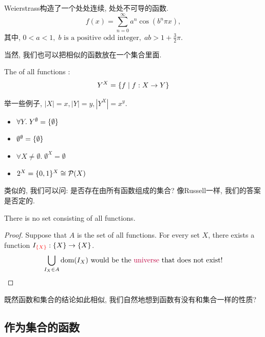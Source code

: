 \begin{fun}
    Weierstrass构造了一个处处连续, 处处不可导的函数. 
    $$
    f(x)=\sum_{n=0} ^\infty a^n \cos(b^n \pi x),
    $$
    其中, $0 < a < 1,\; b \text{ is a positive odd integer},\; ab > 1+\frac{3}{2} \pi$. 
\end{fun}

当然, 我们也可以把相似的函数放在一个集合里面. 

\begin{definition}[$Y^{X}$]
    The  of all functions :
    \[
      Y^{X} = \{f \mid f: X \to Y\}
    \]
\end{definition}

举一些例子, $|X|=x, |Y|=y, |Y^X|=x^y$. 

\begin{eg}
    \begin{itemize}
        \item $\forall Y.\; Y^{\emptyset} = \{\emptyset\}$
        \item $\emptyset^{\emptyset} = \{\emptyset\}$
        \item $\forall X \neq \emptyset.\; \emptyset^{X} =  \emptyset$
        \item $2^{X} = \{0, 1\}^{X} \cong \mathcal{P}(X)$
    \end{itemize}
    
\end{eg}

类似的, 我们可以问: 是否存在由所有函数组成的集合? 像Russell一样, 我们的答案是否定的. 

\begin{theorem}
    There is no set consisting of all functions.
\end{theorem}

\begin{proof}
    Suppose  that $A$ is the set of all functions. 
    For every set $X$, there exists a function $I_{\textcolor{red}{\{X\}}}: \{X\} \to \{X\}$.
    \[
      \bigcup_{I_{X} \in A} \text{dom}(I_{X})
        \text{ would be the \textcolor{purple}{universe} that does not exist!}
    \]
\end{proof}

既然函数和集合的结论如此相似, 我们自然地想到函数有没有和集合一样的性质? 

\subsection{作为集合的函数}

